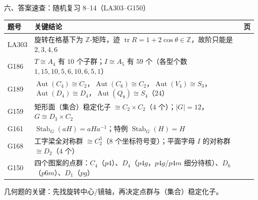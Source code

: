 \documentclass[aspectratio=169,10pt,fontset=none]{ctexbeamer}
\begin{document}
\begin{frame}[t]{六、答案速查：随机复习 8--14（LA303--G150）}
  \centering
  \scriptsize
  \setlength{\tabcolsep}{3pt}
  \renewcommand{\arraystretch}{1.22}
  \begin{tabular}{@{}l p{10.0cm} c@{}}
    \toprule
    题号 & 关键结论 & 页\\
    \midrule
    LA303 & 旋转在格基下为 $\mathbb Z$-矩阵，迹 $\operatorname{tr}R=1+2\cos\theta\in\mathbb Z$，故阶只能是 $2,3,4,6$ & \pageref{ex:LA303}\\
    G186 & $T\cong A_4$ 有 $10$ 个子群；$I\cong A_5$ 有 $59$ 个（各型个数 $1,15,10,5,6,10,6,5,1$） & \pageref{ex:G186}\\
    G189 & $\operatorname{Aut}(C_4)\cong C_2$，$\operatorname{Aut}(C_6)\cong C_2$，$\operatorname{Aut}(V_4)\cong S_3$，$\operatorname{Aut}(D_4)\cong D_4$，$\operatorname{Aut}(Q_8)\cong S_4$（$24$） & \pageref{ex:G189}\\
    G159 & 矩形面（集合）稳定化子 $\cong C_2\times C_2$（$4$ 个）；$|G|=12$，$G\cong D_3\times C_2$ & \pageref{ex:G159}\\
    G161 & $\operatorname{Stab}_G(aH)=aHa^{-1}$；特例 $\operatorname{Stab}_G(H)=H$ & \pageref{ex:G161}\\
    G168 & 工字梁全对称群 $\cong C_2^3$（$8$ 个坐标符号变）；平面字母 $I$ 的对称群 $\cong D_2$（$4$ 个） & \pageref{ex:G168}\\
    G150 & 四个图案的点群：$C_4$（$p4$）、$D_4$（$p4g$，$p4g$/$p4m$ 细分待核）、$D_6$（$p6m$）、$D_1$（$pg$） & \pageref{ex:G150}\\
    \bottomrule
  \end{tabular}
  \par
  \vspace{0.3em}
  {\scriptsize\color{ink!70} 几何题的关键：先找旋转中心/镜轴，再决定点群与（集合）稳定化子。}
\end{frame}
\end{document}
